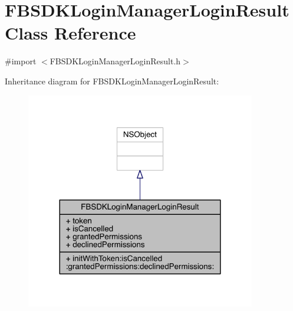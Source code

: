 \hypertarget{interface_f_b_s_d_k_login_manager_login_result}{\section{F\-B\-S\-D\-K\-Login\-Manager\-Login\-Result Class Reference}
\label{interface_f_b_s_d_k_login_manager_login_result}
}


{\ttfamily \#import $<$F\-B\-S\-D\-K\-Login\-Manager\-Login\-Result.\-h$>$}



Inheritance diagram for F\-B\-S\-D\-K\-Login\-Manager\-Login\-Result\-:
\nopagebreak
\begin{figure}[H]
\begin{center}
\leavevmode
\includegraphics[width=284pt]{interface_f_b_s_d_k_login_manager_login_result__inherit__graph}
\end{center}
\end{figure}


